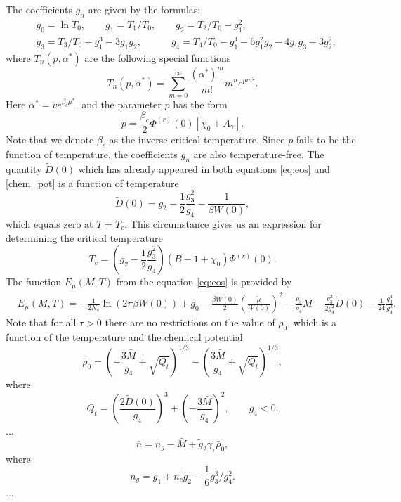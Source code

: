\documentclass[12pt]{article}
\begin{document}
	
	The coefficients $g_n$ are given by the formulas:
	\begin{align}
		& g_0 = \ln T_0, \qquad g_1 = T_1/T_0, \qquad g_2 = T_2/T_0 - g_1^2,  \nonumber \\
		& g_3 = T_3/T_0 - g_1^3 - 3g_1 g_2, \quad \qquad  g_4 = T_4/T_0 - g_1^4 - 6 g_1^2 g_2 - 4 g_1 g_3 - 3 g_2^2,
	\end{align}
	where $T_n(p,\alpha^*)$ are the following special functions
	\begin{equation}
	T_n(p,\alpha^*) = \sum_{m=0}^{\infty} \frac{(\alpha^*)^m}{m!} m^n e^{pm^2}.
	\end{equation}
	Here $\alpha^*=v e^{\beta_c\mu^*}$, and the parameter $p$ has the form
	\begin{equation}
	p = \frac{\beta_c}{2} \Phi^{(r)}(0) [\chi_0 + A_\gamma].
	\end{equation} 
	Note that we denote $\beta_c$ as the inverse critical temperature. Since $p$ fails to be the function of temperature, the coefficients $g_n$ are also temperature-free. The quantity $\tilde D(0)$ which has already appeared in both equations \eqref{eq:eos} and \eqref{chem_pot} is a function of temperature
	\begin{equation}
	\tilde D(0) = g_2 - \frac{1}{2} \frac{g_3^2}{g_4} - \frac{1}{\beta W(0)},
	\end{equation}
	which equals zero at $T=T_c$. This circumstance gives us an expression for determining the critical temperature 
	\begin{equation}
		T_c = \left(g_2 - \frac{1}{2} \frac{g_3^2}{g_4} \right) (B - 1 + \chi_0) \Phi^{(r)}(0).
	\end{equation}    
	The function $E_\mu(M, T)$ from the equation \eqref{eq:eos} is provided by
	\begin{align}
		& E_\mu (M, T) = - \frac{1}{2 N_v} \ln (2\pi \beta W(0)) +  g_0 - \frac{\beta W(0)}{2} \!\! \left( \! \frac{\tilde\mu}{W(0)} \! \right)^{\! 2} \!\!\! - \frac{g_3}{g_4} {M} \! - \frac{g_3^2}{2 g_4^2}  \tilde D(0) - \frac{1}{24} \frac{g_3^4}{g_4^3}. 
	\end{align}
	Note that for all $ \tau> 0 $ there are no restrictions on the value of $ \bar \rho_0 $, which is a function of the temperature and the chemical potential
	\begin{equation}\label{2d18}
	\bar \rho_0 = \left(- \frac{3\bar{M}}{g_4} + \sqrt{Q_t}\right)^{1/3} - \left(  \frac{3\bar{M}}{g_4} + \sqrt{Q_t} \right)^{1/3} \!\!\!\! ,
	\end{equation}
	where
	\begin{equation}
	Q_t = \left(  \frac{2\tilde D(0)}{g_4}\right)^3 + \left( -\frac{3\bar{M}}{g_4}\right)^2, \qquad g_4<0.
	\end{equation}  
	...
	\begin{equation}\label{3d3}
	\bar n = n_g - \bar{M} + \tilde g_2 \gamma_\tau \bar \rho_0,
	\end{equation}
	where
	\begin{equation}\label{3d4}
	n_g = g_1 + n_c \tilde g_2 - \frac{1}{6} g_3^3 / g_4^2.
	\end{equation}
	...
	
\end{document}
